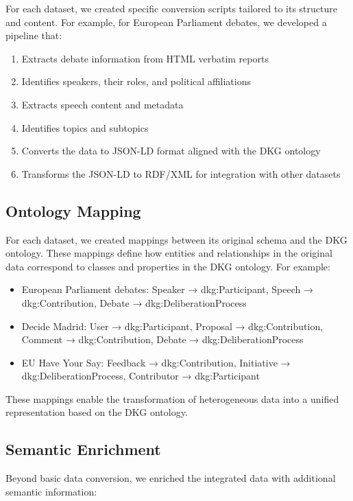 \documentclass[runningheads]{llncs}  %
\begin{document}
For each dataset, we created specific conversion scripts tailored to its structure and content. For example, for European Parliament debates, we developed a pipeline that:

\begin{enumerate}
    \item Extracts debate information from HTML verbatim reports
    \item Identifies speakers, their roles, and political affiliations
    \item Extracts speech content and metadata
    \item Identifies topics and subtopics
    \item Converts the data to JSON-LD format aligned with the DKG ontology
    \item Transforms the JSON-LD to RDF/XML for integration with other datasets
\end{enumerate}

\subsection{Ontology Mapping}
For each dataset, we created mappings between its original schema and the DKG ontology. These mappings define how entities and relationships in the original data correspond to classes and properties in the DKG ontology. For example:

\begin{itemize}
    \item European Parliament debates: Speaker → dkg:Participant, Speech → dkg:Contribution, Debate → dkg:DeliberationProcess
    \item Decide Madrid: User → dkg:Participant, Proposal → dkg:Contribution, Comment → dkg:Contribution, Debate → dkg:DeliberationProcess
    \item EU Have Your Say: Feedback → dkg:Contribution, Initiative → dkg:DeliberationProcess, Contributor → dkg:Participant
\end{itemize}

These mappings enable the transformation of heterogeneous data into a unified representation based on the DKG ontology.

\subsection{Semantic Enrichment}
Beyond basic data conversion, we enriched the integrated data with additional semantic information:
\end{document}
